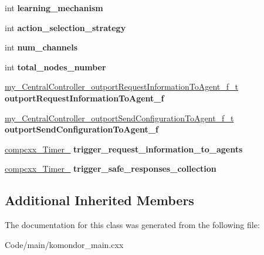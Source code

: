 \begin{DoxyCompactItemize}
\mbox{\label{classcompcxx__CentralController__26_adadb126e210ad589f1b64c9839d8616d}} 
int {\bfseries learning\+\_\+mechanism}
\item 
\mbox{\label{classcompcxx__CentralController__26_ab10780d9882b38a15eb7bdc68ba169cb}} 
int {\bfseries action\+\_\+selection\+\_\+strategy}
\item 
\mbox{\label{classcompcxx__CentralController__26_ad708e1cd02f1e52bd72d95bd26208c82}} 
int {\bfseries num\+\_\+channels}
\item 
\mbox{\label{classcompcxx__CentralController__26_aaa8c2de9e01045ba5f40b09cd255905f}} 
int {\bfseries total\+\_\+nodes\+\_\+number}
\item 
\mbox{\label{classcompcxx__CentralController__26_a96fc4d5ef71d1b7522b9fc3daf26b5f3}} 
\hyperlink{classcompcxx__CentralController__26_1_1my__CentralController__outportRequestInformationToAgent__f__t}{my\+\_\+\+Central\+Controller\+\_\+outport\+Request\+Information\+To\+Agent\+\_\+f\+\_\+t} {\bfseries outport\+Request\+Information\+To\+Agent\+\_\+f}
\item 
\mbox{\label{classcompcxx__CentralController__26_ad83020a62cb3ce10ab720906d682c5b9}} 
\hyperlink{classcompcxx__CentralController__26_1_1my__CentralController__outportSendConfigurationToAgent__f__t}{my\+\_\+\+Central\+Controller\+\_\+outport\+Send\+Configuration\+To\+Agent\+\_\+f\+\_\+t} {\bfseries outport\+Send\+Configuration\+To\+Agent\+\_\+f}
\item 
\mbox{\label{classcompcxx__CentralController__26_a3f6745ae9e9b3a409cdf0d21cbbdd7fd}} 
\hyperlink{classcompcxx__Timer__21}{compcxx\+\_\+\+Timer\+\_} {\bfseries trigger\+\_\+request\+\_\+information\+\_\+to\+\_\+agents}
\item 
\mbox{\label{classcompcxx__CentralController__26_a98598f16c69b2c0fd885d02dd56a025c}} 
\hyperlink{classcompcxx__Timer__22}{compcxx\+\_\+\+Timer\+\_} {\bfseries trigger\+\_\+safe\+\_\+responses\+\_\+collection}
\end{DoxyCompactItemize}
\subsection*{Additional Inherited Members}


The documentation for this class was generated from the following file\+:\begin{DoxyCompactItemize}
\item 
Code/main/komondor\+\_\+main.\+cxx\end{DoxyCompactItemize}
